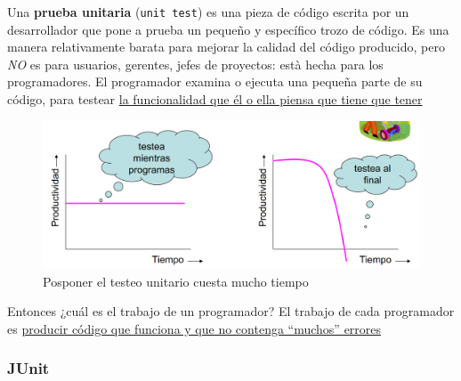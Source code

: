 Una \textbf{prueba unitaria} (\texttt{unit test}) es una pieza de código escrita por un desarrollador que pone a prueba un pequeño y específico trozo de código.
Es una manera relativamente barata para mejorar la calidad del código producido, pero \textit{NO} es para usuarios, gerentes, jefes de proyectos: està hecha para los programadores.
El programador examina o ejecuta una pequeña
parte de su código, para testear
\ul{la funcionalidad que él o ella piensa que tiene que tener}

\begin{figure}[htbp]
   \centering
   \includegraphics{images/03/unitPostpone.png}
   \caption{Posponer el testeo unitario cuesta mucho tiempo}
   \label{fig:03/unitPostpone}
\end{figure}


Entonces ¿cuál es el trabajo de un programador? El trabajo de cada programador es \ul{producir código que
funciona y que no contenga ``muchos'' errores}

\subsubsection{JUnit}

